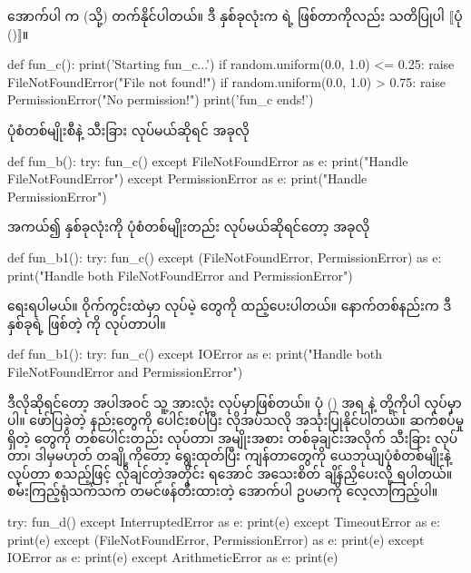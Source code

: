 အောက်ပါ  က  (သို့)  တက်နိုင်ပါတယ်။ ဒီ  နှစ်ခုလုံးက  ရဲ့  ဖြစ်တာကိုလည်း သတိပြုပါ $\big\llbracket$ပုံ (\fRefNo{\ref{fig:exceptionhier}})$\big\rrbracket$။
%
\begin{py}
def fun_c():
    print('Starting fun_c...')
    if random.uniform(0.0, 1.0) <= 0.25:
        raise FileNotFoundError("File not found!")
    if random.uniform(0.0, 1.0) > 0.75:
        raise PermissionError("No permission!")
    print('fun_c ends!')
\end{py}
%
ပုံစံတစ်မျိုးစီနဲ့ သီးခြား  လုပ်မယ်ဆိုရင် အခုလို 
%
\begin{py}
def fun_b():
    try:
        fun_c()
    except FileNotFoundError as e:
        print("Handle FileNotFoundError")
    except PermissionError as e:
        print("Handle PermissionError")
\end{py}
%
အကယ်၍  နှစ်ခုလုံးကို ပုံစံတစ်မျိုးတည်း  လုပ်မယ်ဆိုရင်တော့ အခုလို
%
\begin{py}
def fun_b1():
    try:
        fun_c()
    except (FileNotFoundError, PermissionError) as e:
        print("Handle both FileNotFoundError and PermissionError")
\end{py}
%
ရေးရပါမယ်။ ဝိုက်ကွင်းထဲမှာ  လုပ်မဲ့  တွေကို ထည့်ပေးပါတယ်။ နောက်တစ်နည်းက ဒီ  နှစ်ခုရဲ့  ဖြစ်တဲ့  ကို  လုပ်တာပါ။
%
\begin{py}
def fun_b1():
    try:
        fun_c()
    except IOError as e:
        print("Handle both FileNotFoundError and PermissionError")
\end{py}
%
ဒီလိုဆိုရင်တော့  အပါအဝင် သူ့   အားလုံး  လုပ်မှာဖြစ်တယ်။ ပုံ (\fRefNo{\ref{fig:exceptionhier}})  အရ  နဲ့  တို့ကိုပါ  လုပ်မှာပါ။ ဖော်ပြခဲ့တဲ့  နည်းတွေကို ပေါင်းစပ်ပြီး လိုအပ်သလို အသုံးပြုနိုင်ပါတယ်။ ဆက်စပ်မှု ရှိတဲ့  တွေကို တစ်ပေါင်းတည်း  လုပ်တာ၊ အမျိုးအစား တစ်ခုချင်းအလိုက် သီးခြား  လုပ်တာ၊ ဒါမှမဟုတ် တချို့ကိုတော့ ရွေးထုတ်ပြီး ကျန်တာတွေကို ယေဘုယျပုံစံတစ်မျိုးနဲ့  လုပ်တာ စသည့်ဖြင့် လိုချင်တဲ့အတိုင်း ရအောင် အသေးစိတ် ချိန်ညှိပေးလို့ ရပါတယ်။ စမ်းကြည့်ရုံသက်သက် တမင်ဖန်တီးထားတဲ့ အောက်ပါ ဥပမာကို လေ့လာကြည့်ပါ။
%
%
\begin{py}
try:
    fun_d()
except InterruptedError as e:
    print(e)
except TimeoutError as e:
    print(e)
except (FileNotFoundError, PermissionError) as e:
    print(e)
except IOError as e:
    print(e)
except ArithmeticError as e:
    print(e)
\end{py}
